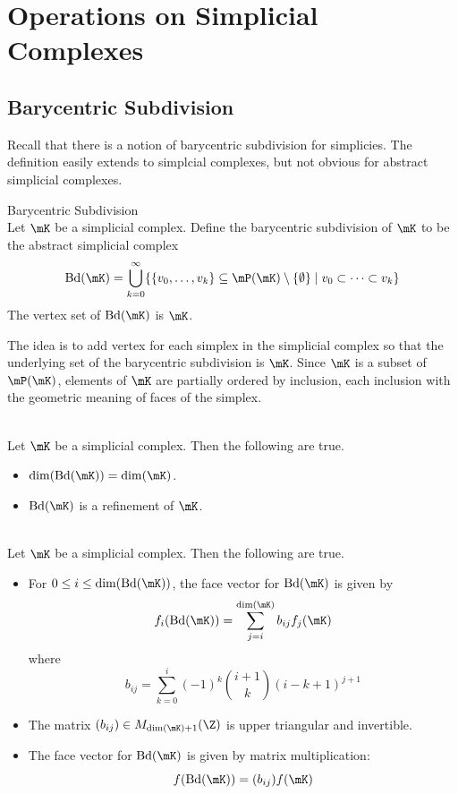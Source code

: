 \documentclass[a4paper]{article}
\begin{document}
\pagebreak
\section{Operations on Simplicial Complexes}
\subsection{Barycentric Subdivision}
Recall that there is a notion of barycentric subdivision for simplicies. The definition easily extends to simplcial complexes, but not obvious for abstract simplicial complexes. 

\begin{defn}{Barycentric Subdivision}{}\\
Let $\mK$ be a simplicial complex. Define the barycentric subdivision of $\mK$ to be the abstract simplicial complex $$\text{Bd}(\mK)=\bigcup_{k=0}^\infty\{\{v_0,\dots,v_k\}\subseteq\mP(\mK)\setminus\{\emptyset\}\;|\;v_0\subset\cdots\subset v_k\}$$ The vertex set of $\text{Bd}(\mK)$ is $\mK$. 
\end{defn}

The idea is to add vertex for each simplex in the simplicial complex so that the underlying set of the barycentric subdivision is $\mK$. Since $\mK$ is a subset of $\mP(\mK)$, elements of $\mK$ are partially ordered by inclusion, each inclusion with the geometric meaning of faces of the simplex. 

\begin{lmm}{}{}\\
Let $\mK$ be a simplicial complex. Then the following are true. 
\begin{itemize}
\item $\dim(\text{Bd}(\mK))=\dim(\mK)$. 
\item $\text{Bd}(\mK)$ is a refinement of $\mK$. 
\end{itemize}
\end{lmm}

\begin{prp}{}{}\\
Let $\mK$ be a simplicial complex. Then the following are true. 
\begin{itemize}
\item For $0\leq i\leq\dim(\text{Bd}(\mK))$, the face vector for $\text{Bd}(\mK)$ is given by $$f_i(\text{Bd}(\mK))=\sum_{j=i}^{\dim(\mK)}b_{ij}f_j(\mK)$$ where $$b_{ij}=\sum_{k=0}^i(-1)^k\binom{i+1}{k}(i-k+1)^{j+1}$$
\item The matrix $(b_{ij})\in M_{\dim(\mK)+1}(\Z)$ is upper triangular and invertible. 
\item The face vector for $\text{Bd}(\mK)$ is given by matrix multiplication: $$f(\text{Bd}(\mK))=(b_{ij})f(\mK)$$
\end{itemize}
\end{prp}
\end{document}
